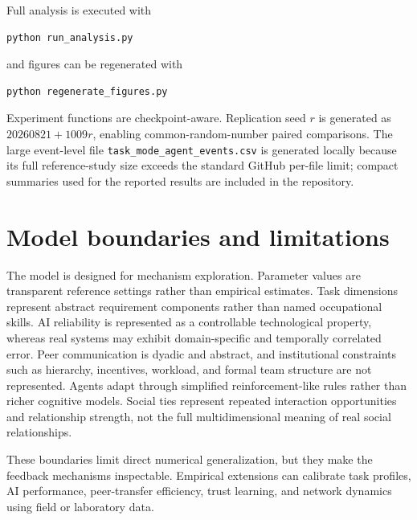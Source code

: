 \documentclass[11pt]{article}
\begin{document}
Full analysis is executed with
\begin{verbatim}
python run_analysis.py
\end{verbatim}
and figures can be regenerated with
\begin{verbatim}
python regenerate_figures.py
\end{verbatim}
Experiment functions are checkpoint-aware. Replication seed $r$ is generated as $20260821+1009r$, enabling common-random-number paired comparisons. The large event-level file \texttt{task\_mode\_agent\_events.csv} is generated locally because its full reference-study size exceeds the standard GitHub per-file limit; compact summaries used for the reported results are included in the repository.

\section{Model boundaries and limitations}
The model is designed for mechanism exploration. Parameter values are transparent reference settings rather than empirical estimates. Task dimensions represent abstract requirement components rather than named occupational skills. AI reliability is represented as a controllable technological property, whereas real systems may exhibit domain-specific and temporally correlated error. Peer communication is dyadic and abstract, and institutional constraints such as hierarchy, incentives, workload, and formal team structure are not represented. Agents adapt through simplified reinforcement-like rules rather than richer cognitive models. Social ties represent repeated interaction opportunities and relationship strength, not the full multidimensional meaning of real social relationships.

These boundaries limit direct numerical generalization, but they make the feedback mechanisms inspectable. Empirical extensions can calibrate task profiles, AI performance, peer-transfer efficiency, trust learning, and network dynamics using field or laboratory data.
\end{document}
